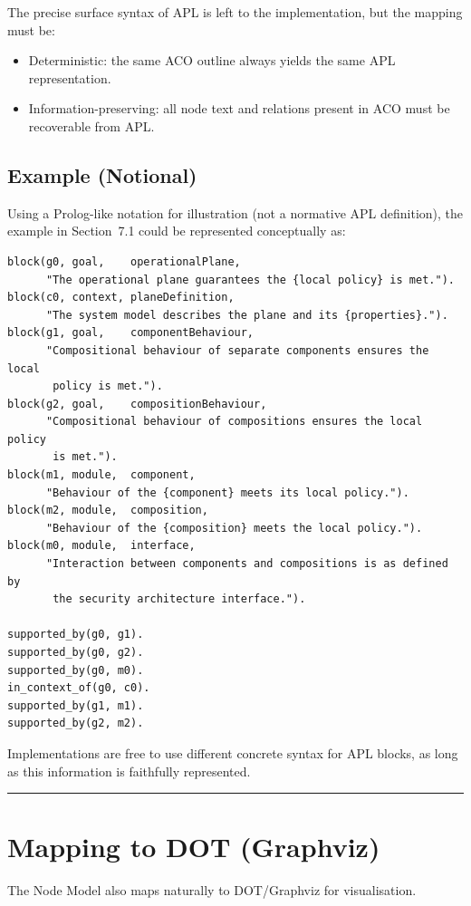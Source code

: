 \documentclass[11pt]{article}
\begin{document}
The precise surface syntax of APL is left to the implementation, but the mapping must be:
\begin{itemize}[leftmargin=2em]
  \item Deterministic: the same ACO outline always yields the same APL representation.
  \item Information-preserving: all node text and relations present in ACO must be recoverable from APL.
\end{itemize}

\subsection{Example (Notional)}

Using a Prolog-like notation for illustration (not a normative APL definition), the example in Section~7.1 could be represented conceptually as:

\begin{verbatim}
block(g0, goal,    operationalPlane,
      "The operational plane guarantees the {local policy} is met.").
block(c0, context, planeDefinition,
      "The system model describes the plane and its {properties}.").
block(g1, goal,    componentBehaviour,
      "Compositional behaviour of separate components ensures the local
       policy is met.").
block(g2, goal,    compositionBehaviour,
      "Compositional behaviour of compositions ensures the local policy
       is met.").
block(m1, module,  component,
      "Behaviour of the {component} meets its local policy.").
block(m2, module,  composition,
      "Behaviour of the {composition} meets the local policy.").
block(m0, module,  interface,
      "Interaction between components and compositions is as defined by
       the security architecture interface.").

supported_by(g0, g1).
supported_by(g0, g2).
supported_by(g0, m0).
in_context_of(g0, c0).
supported_by(g1, m1).
supported_by(g2, m2).
\end{verbatim}

Implementations are free to use different concrete syntax for APL blocks, as long as this information is faithfully represented.

\bigskip
\hrule
\bigskip

\section{Mapping to DOT (Graphviz)}

The Node Model also maps naturally to DOT/Graphviz for visualisation.
\end{document}
